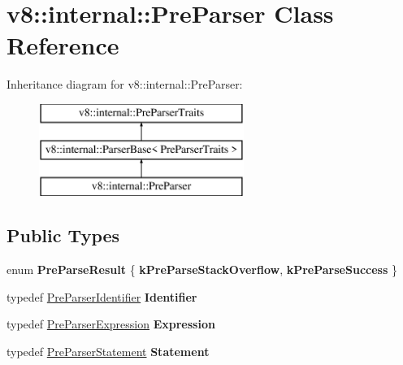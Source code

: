 \hypertarget{classv8_1_1internal_1_1_pre_parser}{}\section{v8\+:\+:internal\+:\+:Pre\+Parser Class Reference}
\label{classv8_1_1internal_1_1_pre_parser}
Inheritance diagram for v8\+:\+:internal\+:\+:Pre\+Parser\+:\begin{figure}[H]
\begin{center}
\leavevmode
\includegraphics[height=3.000000cm]{classv8_1_1internal_1_1_pre_parser}
\end{center}
\end{figure}
\subsection*{Public Types}
\begin{DoxyCompactItemize}
\item 
\hypertarget{classv8_1_1internal_1_1_pre_parser_ac699e8c83f71d51ea5ad08af12acf9f9}{}enum {\bfseries Pre\+Parse\+Result} \{ {\bfseries k\+Pre\+Parse\+Stack\+Overflow}, 
{\bfseries k\+Pre\+Parse\+Success}
 \}\label{classv8_1_1internal_1_1_pre_parser_ac699e8c83f71d51ea5ad08af12acf9f9}

\item 
\hypertarget{classv8_1_1internal_1_1_pre_parser_a88411e7cd2cbc7a480a32471f2db01e8}{}typedef \hyperlink{classv8_1_1internal_1_1_pre_parser_identifier}{Pre\+Parser\+Identifier} {\bfseries Identifier}\label{classv8_1_1internal_1_1_pre_parser_a88411e7cd2cbc7a480a32471f2db01e8}

\item 
\hypertarget{classv8_1_1internal_1_1_pre_parser_ae3385c22c7148a44bad3c3b3d6265867}{}typedef \hyperlink{classv8_1_1internal_1_1_pre_parser_expression}{Pre\+Parser\+Expression} {\bfseries Expression}\label{classv8_1_1internal_1_1_pre_parser_ae3385c22c7148a44bad3c3b3d6265867}

\item 
\hypertarget{classv8_1_1internal_1_1_pre_parser_a63f5606243398ad8e868162f6103eb96}{}typedef \hyperlink{classv8_1_1internal_1_1_pre_parser_statement}{Pre\+Parser\+Statement} {\bfseries Statement}\label{classv8_1_1internal_1_1_pre_parser_a63f5606243398ad8e868162f6103eb96}

\end{DoxyCompactItemize}

